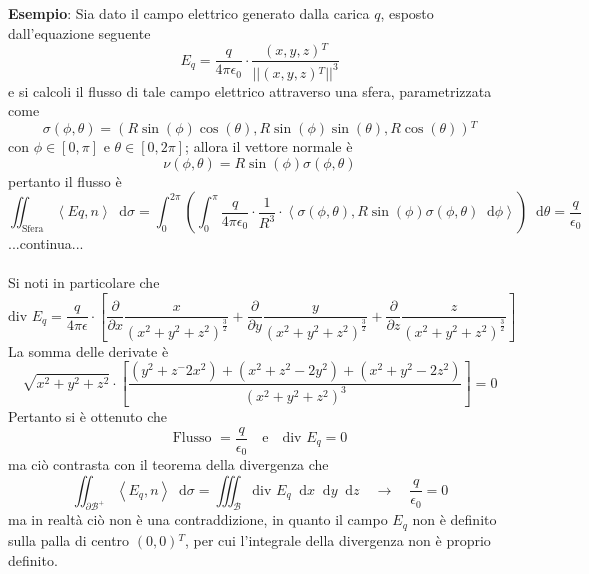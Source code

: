 \documentclass[a4paper]{extarticle}
\newcommand*\dif{\mathop{}\!\mathrm{d}}
\begin{document}
\vspace{2em}
\noindent
\textbf{Esempio}: Sia dato il campo elettrico generato dalla carica $q$, esposto dall'equazione seguente
\[E_q=\dfrac{q}{4 \pi \epsilon_0} \cdot \dfrac{(x,y,z){^T}}{\vert\vert(x,y,z){^T}\vert\vert^3}\]
e si calcoli il flusso di tale campo elettrico attraverso una sfera, parametrizzata come
\[\sigma(\phi,\theta)=\left(R \sin(\phi) \cos(\theta), R \sin(\phi) \sin(\theta), R \cos(\theta)\right){^T}\]
con $\phi \in [0,\pi]$ e $\theta \in [0,2\pi]$; allora il vettore normale è
\[\nu(\phi,\theta)=R \sin(\phi) \sigma(\phi,\theta)\]
pertanto il flusso è
\[\iint_{\text{Sfera}} \left<Eq,n\right> \dif \sigma = \int_0^{2\pi} \left(\int_0^\pi \dfrac{q}{4 \pi \epsilon_0} \cdot \dfrac{1}{R^3} \cdot \left<\sigma(\phi,\theta), R \sin(\phi) \sigma(\phi,\theta) \dif \phi\right> \right) \dif \theta = \dfrac{q}{\epsilon_0}\]
...continua...\\\\
Si noti in particolare che
\[\text{div } E_q = \dfrac{q}{4 \pi \epsilon} \cdot \left[\dfrac{\partial}{\partial x} \dfrac{x}{(x^2+y^2+z^2)^{\frac{3}{2}}} + \dfrac{\partial }{\partial y} \dfrac{y}{(x^2+y^2+z^2)^{\frac{3}{2}}} + \dfrac{\partial}{\partial z} \dfrac{z}{(x^2+y^2+z^2)^{\frac{3}{2}}}\right]\]
La somma delle derivate è
\[\sqrt{x^2+y^2+z^2} \cdot \left[ \dfrac{\left(y^2+z^-2x^2\right) + \left(x^2+z^2-2y^2\right) + \left(x^2+y^2-2z^2\right)}{(x^2+y^2+z^2)^3}\right] = 0\]
Pertanto si è ottenuto che
\[\text{Flusso }=\dfrac{q}{\epsilon_0} \hspace{1em} \text{e} \hspace{1em} \text{div } E_q=0\]
ma ciò contrasta con il teorema della divergenza che
\[\iint_{\partial \mathcal{B}^+} \left<E_q,n\right> \dif \sigma = \iiint_\mathcal{B} \text{div } E_q \dif x \dif y \dif z \hspace{1em} \rightarrow \hspace{1em} \dfrac{q}{\epsilon_0}=0\]
ma in realtà ciò non è una contraddizione, in quanto il campo $E_q$ non è definito sulla palla di centro $(0,0){^T}$, per cui l'integrale della divergenza non è proprio definito.
\end{document}
